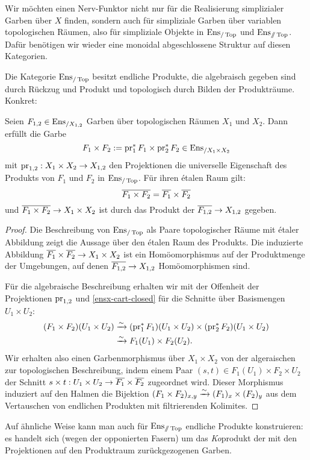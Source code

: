 Wir möchten einen Nerv-Funktor nicht nur für die Realisierung
simplizialer Garben über $X$ finden, sondern auch für simpliziale
Garben über variablen topologischen Räumen, also für simpliziale
Objekte in $\operatorname{Ens}_{/\operatorname{Top}}$ und $\operatorname{Ens}_{\mathbin{/\mkern-6mu/} \operatorname{Top}}$. Dafür benötigen
wir wieder eine monoidal abgeschlossene Struktur auf diesen
Kategorien.

Die Kategorie $\operatorname{Ens}_{/\operatorname{Top}}$ besitzt endliche Produkte, die
algebraisch gegeben sind durch Rückzug und Produkt und topologisch
durch Bilden der Produkträume. Konkret:
\begin{prop}
  Seien $F_{1,2} \in \operatorname{Ens}_{/X_{1,2}}$ Garben über topologischen Räumen
  $X_1$ und $X_2$. Dann erfüllt die Garbe
  \[ F_1 \times F_2 := \operatorname{pr}_1^* F_1 \times \operatorname{pr}_2^* F_2 \in \operatorname{Ens}_{/X_1 \times X_2} \]
  mit $\operatorname{pr}_{1,2}: X_1 \times X_2 \to X_{1,2}$ den Projektionen die
  universelle Eigenschaft des Produkts von $F_1$ und $F_2$ in
  $\operatorname{Ens}_{/\operatorname{Top}}$. Für ihren étalen Raum gilt:
  \[ \overline{F_1 \times F_2} = \overline{F_1} \times \overline{F_2} \]
  und $\overline{F_1 \times F_2} \to X_1 \times X_2$ ist durch das
  Produkt der $\overline{F_{1,2}} \to X_{1,2}$ gegeben.
\end{prop}
\begin{proof}
  Die Beschreibung von $\operatorname{Ens}_{/\operatorname{Top}}$ als Paare topologischer Räume
  mit étaler Abbildung zeigt die Aussage über den étalen Raum des
  Produkts. Die induzierte Abbildung $\overline{F_1}
  \times \overline{F_2} \to X_1 \times X_2$ ist ein Homöomorphismus
  auf der Produktmenge der Umgebungen, auf denen $\overline{F_{1,2}}
  \to X_{1,2}$ Homöomorphismen sind.
  
  Für die algebraische Beschreibung erhalten wir mit der Offenheit der
  Projektionen $\operatorname{pr}_{1,2}$ und \ref{ensx-cart-closed} für die Schnitte
  über Basismengen $U_1 \times U_2$:
  \begin{align*}
    (F_1 \times F_2)(U_1 \times U_2)
    &\xrightarrow[]{\sim} (\operatorname{pr}_1^* F_1)(U_1 \times U_2) \times (\operatorname{pr}_2^* F_2)(U_1 \times U_2) \\
    &\xrightarrow[]{\sim} F_1(U_1) \times F_2(U_2).
  \end{align*}
  Wir erhalten also einen Garbenmorphismus über $X_1 \times X_2$ von
  der algeraischen zur topologischen Beschreibung, indem einem Paar
  $(s, t) \in F_1(U_1) \times F_2 \times U_2$ der Schnitt $s \times t:
  U_1 \times U_2 \to \overline{F_1} \times \overline{F_2}$
  zugeordnet wird. Dieser Morphismus induziert auf den Halmen die
  Bijektion $(F_1 \times F_2)_{x, y} \xrightarrow[]{\sim} (F_1)_x \times (F_2)_y$ aus
  dem Vertauschen von endlichen Produkten mit filtrierenden Kolimites.
\end{proof}
\begin{bem}
  Auf ähnliche Weise kann man auch für $\operatorname{Ens}_{\mathbin{/\mkern-6mu/} \operatorname{Top}}$ endliche
  Produkte konstruieren: es handelt sich (wegen der opponierten
  Fasern) um das \emph{Ko}produkt der mit den Projektionen auf den
  Produktraum zurückgezogenen Garben.
\end{bem}

